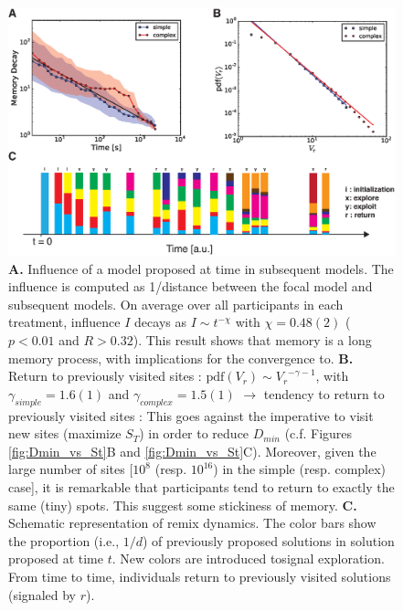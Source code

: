 \begin{figure}[h!]
\begin{center}
\includegraphics[width=15cm]{figures/memory.eps}
\caption{{\bf A.} Influence of a model proposed at time in subsequent models. The influence is computed as 1/distance between the focal model and subsequent models. On average over all participants in each treatment, influence $I$ decays as $I \sim t^{-\chi}$ with $\chi = 0.48(2)$ ($p < 0.01$ and $R > 0.32$). This result shows that memory is a long memory process, with implications for the convergence to. {\bf B.} Return to previously visited sites : $\mathrm{pdf}(V_r) \sim {V_r}^{- \gamma -1}$, with $\gamma_{simple} = 1.6(1)$ and $\gamma_{complex} = 1.5(1)$ $\rightarrow$ tendency to return to previously visited sites : This goes against the imperative to visit new sites (maximize $S_T$) in order to reduce $D_{min}$ (c.f. Figures \ref{fig:Dmin_vs_St}B and \ref{fig:Dmin_vs_St}C). Moreover, given the large number of sites [$10^{8}$ (resp. $10^{16}$) in the simple (resp. complex) case], it is remarkable that participants tend to return to exactly the same (tiny) spots. This suggest some stickiness of memory. {\bf C.}  Schematic representation of remix dynamics. The color bars show the proportion (i.e., $1/d$) of previously proposed solutions in solution proposed at time $t$. New colors are introduced 	tosignal exploration. From time to time, individuals return to previously visited solutions (signaled by $r$).}
\label{fig:memory}
\end{center}
\end{figure}


\clearpage





